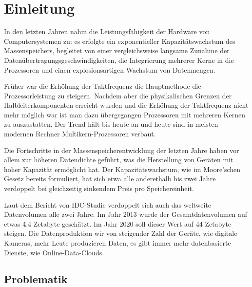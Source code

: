 
\section{Einleitung}
In den letzten Jahren nahm die Leistungsfähigkeit der Hardware von Computersystemen zu: es erfolgte ein exponentieller Kapazitätswachstum des Massenspeichers, begleitet von einer vergleichsweise langsame Zunahme der Datenübertragungsgeschwindigkeiten, die Integrierung mehrerer Kerne in die Prozessoren und einen explosionsartigen Wachstum von Datenmengen.

Früher war die Erhöhung der Taktfrequenz die Hauptmethode die Prozessorleistung zu steigern. Nachdem aber die physikalischen Grenzen der Halbleiterkomponenten erreicht wurden und die Erhöhung der Taktfrequenz nicht mehr möglich war ist man dazu übergegangen Prozessoren mit mehreren Kernen zu auszustatten. Der Trend hält bis heute an und heute sind in meisten modernen Rechner Multikern-Prozessoren verbaut.

Die Fortschritte in der Massenspeicherentwicklung der letzten Jahre haben vor allem zur höheren Datendichte geführt, was die Herstellung von Geräten mit hoher Kapazität ermöglicht hat. Der Kapazitätswachstum, wie im Moore'schen Gesetz bereits formuliert, hat sich etwa alle anderethalb bis zwei Jahre verdoppelt bei gleichzeitig sinkendem Preis pro Speichereinheit.

Laut dem Bericht von IDC-Studie \cite{idc} verdoppelt sich auch das weltweite Datenvolumen alle zwei Jahre. Im Jahr 2013 wurde der Gesamtdatenvolumen auf etwas 4.4 Zetabyte geschätzt. Im Jahr 2020 soll dieser Wert auf 44 Zetabyte steigen. Die Datenproduktion wir von steigender Zahl der Geräte, wie digitale Kameras, mehr Leute produzieren Daten, es gibt immer mehr datenbasierte Dienste, wie Online-Data-Clouds.



\subsection{Problematik}


